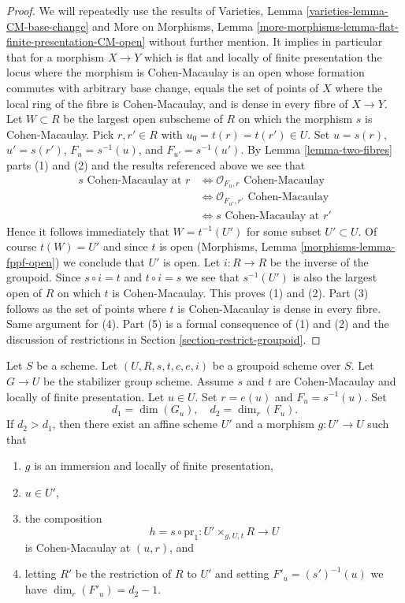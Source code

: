 \begin{proof}
We will repeatedly use the results of
Varieties, Lemma \ref{varieties-lemma-CM-base-change}
and
More on Morphisms,
Lemma \ref{more-morphisms-lemma-flat-finite-presentation-CM-open}
without further mention. It implies in particular that for a morphism
$X \to Y$ which is flat and locally of finite presentation the locus
where the morphism is Cohen-Macaulay is an open whose formation commutes
with arbitrary base change, equals the set of points of $X$ where
the local ring of the fibre is Cohen-Macaulay, and is dense in every
fibre of $X \to Y$.
Let $W \subset R$ be the largest open subscheme of $R$ on which the morphism
$s$ is Cohen-Macaulay. Pick $r, r' \in R$ with $u_0 = t(r) = t(r') \in U$.
Set $u = s(r)$, $u' = s(r')$, $F_u = s^{-1}(u)$, and $F_{u'} = s^{-1}(u')$.
By
Lemma \ref{lemma-two-fibres} parts (1) and (2)
and the results referenced above we see that
\begin{align*}
s\text{ Cohen-Macaulay at }r
& \Leftrightarrow
\mathcal{O}_{F_u, r}\text{ Cohen-Macaulay} \\
& \Leftrightarrow
\mathcal{O}_{F_{u'}, r'}\text{ Cohen-Macaulay} \\
& \Leftrightarrow
s\text{ Cohen-Macaulay at }r'
\end{align*}
Hence it follows immediately that $W = t^{-1}(U')$ for some subset
$U' \subset U$. Of course $t(W) = U'$ and since $t$ is open
(Morphisms, Lemma \ref{morphisms-lemma-fppf-open})
we conclude that $U'$ is open. Let $i : R \to R$ be the inverse of the
groupoid. Since $s \circ i = t$ and $t \circ i = s$ we see that $s^{-1}(U')$
is also the largest open of $R$ on which $t$ is Cohen-Macaulay.
This proves (1) and (2).
Part (3) follows as the set of points where $t$ is Cohen-Macaulay
is dense in every fibre. Same argument for (4).
Part (5) is a formal consequence of (1) and (2) and the discussion
of restrictions in Section \ref{section-restrict-groupoid}.
\end{proof}

\begin{lemma}
\label{lemma-slice}
Let $S$ be a scheme.
Let $(U, R, s, t, c, e, i)$ be a groupoid scheme over $S$.
Let $G \to U$ be the stabilizer group scheme.
Assume $s$ and $t$ are Cohen-Macaulay and locally of finite presentation.
Let $u \in U$. Set $r = e(u)$ and $F_u = s^{-1}(u)$. Set
$$
d_1 = \dim(G_u),\quad d_2 = \dim_r(F_u).
$$
If $d_2 > d_1$, then there exist an affine scheme $U'$
and a morphism $g : U' \to U$ such that
\begin{enumerate}
\item $g$ is an immersion and locally of finite presentation,
\item $u \in U'$,
\item the composition
$$
h = s \circ \text{pr}_1 : U' \times_{g, U, t} R \longrightarrow U
$$
is Cohen-Macaulay at $(u, r)$, and
\item letting $R'$ be the restriction of $R$ to $U'$ and setting
$F'_u = (s')^{-1}(u)$ we have $\dim_r(F'_u) = d_2 - 1$.
\end{enumerate}
\end{lemma}


